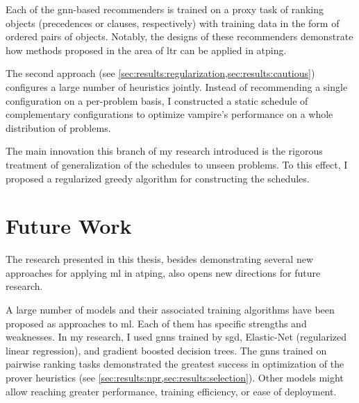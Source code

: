 Each of the \acrshort{gnn}-based recommenders is trained on a proxy task of ranking objects (precedences or clauses, respectively)
with training data in the form of ordered pairs of objects.
Notably, the designs of these recommenders demonstrate how methods proposed in the area of \acrlong{ltr}
can be applied in \gls{atping}.

The second approach (see \cref{sec:results:regularization,sec:results:cautious}) configures a large number of heuristics jointly.
Instead of recommending a single configuration on a per-problem basis,
I constructed a static schedule of complementary configurations to optimize \gls{vampire}'s performance on a whole distribution of problems.

The main innovation this branch of my research introduced is the rigorous treatment of generalization of the schedules to unseen problems.
To this effect, I proposed a regularized greedy algorithm for constructing the schedules.


\section{Future Work}



The research presented in this thesis,
besides demonstrating several new approaches for applying \gls{ml} in \gls{atping},
also opens new directions for future research.

A large number of models and their associated training algorithms have been proposed as approaches to \gls{ml}.
Each of them has specific strengths and weaknesses.
In my research, I used \glspl{gnn} trained by \acrlong{sgd}, Elastic-Net (regularized linear regression), and gradient boosted decision trees.
The \glspl{gnn} trained on pairwise ranking tasks demonstrated the greatest success in optimization of the prover heuristics (see \cref{sec:results:npr,sec:results:selection}).
Other models might allow reaching greater performance, training efficiency, or ease of deployment.

